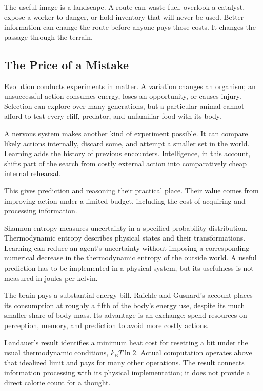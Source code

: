 The useful image is a landscape. A route can waste fuel, overlook a catalyst, expose a worker to danger, or hold inventory that will never be used. Better information can change the route before anyone pays those costs. It changes the passage through the terrain.

\subsection{The Price of a Mistake}


Evolution conducts experiments in matter. A variation changes an organism; an unsuccessful action consumes energy, loses an opportunity, or causes injury. Selection can explore over many generations, but a particular animal cannot afford to test every cliff, predator, and unfamiliar food with its body.

A nervous system makes another kind of experiment possible. It can compare likely actions internally, discard some, and attempt a smaller set in the world. Learning adds the history of previous encounters. Intelligence, in this account, shifts part of the search from costly external action into comparatively cheap internal rehearsal.

 This gives prediction and reasoning their practical place. Their value comes from improving action under a limited budget, including the cost of acquiring and processing information.


Shannon entropy measures uncertainty in a specified probability distribution.\cite{shannon1948} Thermodynamic entropy describes physical states and their transformations. Learning can reduce an agent's uncertainty without imposing a corresponding numerical decrease in the thermodynamic entropy of the outside world. A useful prediction has to be implemented in a physical system, but its usefulness is not measured in joules per kelvin.

The brain pays a substantial energy bill. Raichle and Gusnard's account places its consumption at roughly a fifth of the body's energy use, despite its much smaller share of body mass.\cite{raichle2002} Its advantage is an exchange: spend resources on perception, memory, and prediction to avoid more costly actions.

Landauer's result identifies a minimum heat cost for resetting a bit under the usual thermodynamic conditions, $k_{\mathrm B}T\ln2$.\cite{landauer1961} Actual computation operates above that idealized limit and pays for many other operations. The result connects information processing with its physical implementation; it does not provide a direct calorie count for a thought.

